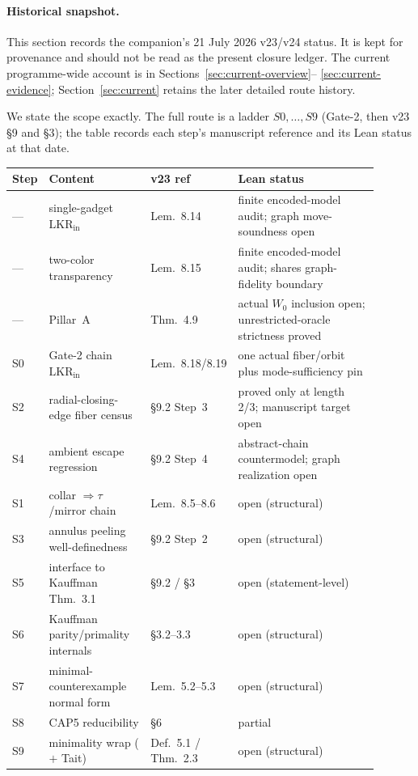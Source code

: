 \documentclass[11pt]{article}
\theoremstyle{definition}
\newcommand{\Wz}{W_0}
\newcommand{\LKR}{\mathrm{LKR}_{\mathrm{in}}}
\begin{document}
\paragraph{Historical snapshot.}
This section records the companion's 21 July 2026 v23/v24 status.  It is kept
for provenance and should not be read as the present closure ledger. The
current programme-wide account is in Sections~\ref{sec:current-overview}--
\ref{sec:current-evidence}; Section~\ref{sec:current} retains the later
detailed route history.

We state the scope exactly. The full route is a ladder $S0,\dots,S9$ (Gate-2, then
v23 \S9 and \S3); the table records each step's manuscript reference and its
Lean status at that date.

\begin{center}\small
\begin{tabular}{@{}p{0.05\linewidth}p{0.28\linewidth}p{0.17\linewidth}p{0.40\linewidth}@{}}
\toprule
Step & Content & v23 ref & Lean status \\
\midrule
--- & single-gadget $\LKR$                & Lem.~8.14        & finite encoded-model audit; graph move-soundness open \\
--- & two-color transparency              & Lem.~8.15        & finite encoded-model audit; shares graph-fidelity boundary \\
--- & Pillar~A                            & Thm.~4.9         & actual $\Wz$ inclusion open; unrestricted-oracle strictness proved \\
S0  & Gate-2 chain $\LKR$                  & Lem.~8.18/8.19   & one actual fiber/orbit plus mode-sufficiency pin \\
S2  & radial-closing-edge fiber census     & \S9.2 Step~3     & proved only at length 2/3; manuscript target open \\
S4  & ambient escape regression            & \S9.2 Step~4     & abstract-chain countermodel; graph realization open \\
S1  & collar $\Rightarrow\tau$/mirror chain & Lem.~8.5--8.6   & open (structural) \\
S3  & annulus peeling well-definedness     & \S9.2 Step~2     & open (structural) \\
S5  & interface to Kauffman Thm.~3.1       & \S9.2 / \S3      & open (statement-level) \\
S6  & Kauffman parity/primality internals  & \S3.2--3.3       & open (structural) \\
S7  & minimal-counterexample normal form   & Lem.~5.2--5.3    & open (structural) \\
S8  & CAP5 reducibility                    & \S6              & partial \\
S9  & minimality wrap ($+$ Tait)           & Def.~5.1 / Thm.~2.3 & open (structural) \\
\bottomrule
\end{tabular}
\end{center}
\end{document}
